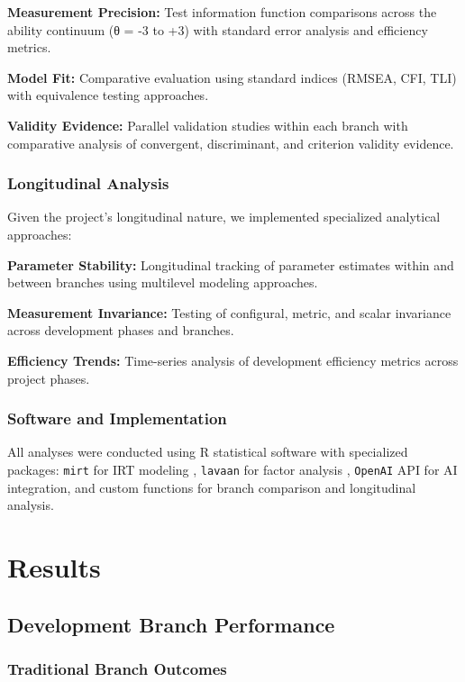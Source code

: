 \documentclass[12pt,a4paper]{article}
\begin{document}
\textbf{Measurement Precision:} Test information function comparisons across the ability continuum (θ = -3 to +3) with standard error analysis and efficiency metrics.

\textbf{Model Fit:} Comparative evaluation using standard indices (RMSEA, CFI, TLI) with equivalence testing approaches.

\textbf{Validity Evidence:} Parallel validation studies within each branch with comparative analysis of convergent, discriminant, and criterion validity evidence.

\subsubsection{Longitudinal Analysis}

Given the project's longitudinal nature, we implemented specialized analytical approaches:

\textbf{Parameter Stability:} Longitudinal tracking of parameter estimates within and between branches using multilevel modeling approaches.

\textbf{Measurement Invariance:} Testing of configural, metric, and scalar invariance across development phases and branches.

\textbf{Efficiency Trends:} Time-series analysis of development efficiency metrics across project phases.

\subsubsection{Software and Implementation}

All analyses were conducted using R statistical software with specialized packages: \texttt{mirt} for IRT modeling \cite{Chalmers2012}, \texttt{lavaan} for factor analysis \cite{Rosseel2012}, \texttt{OpenAI} API for AI integration, and custom functions for branch comparison and longitudinal analysis.

\section{Results}

\subsection{Development Branch Performance}

\subsubsection{Traditional Branch Outcomes}
\end{document}
